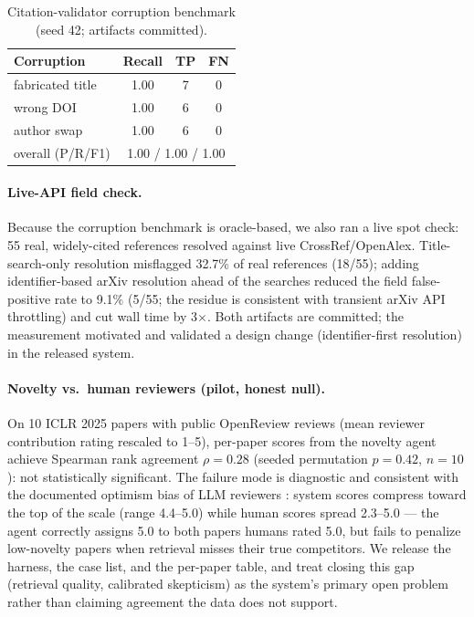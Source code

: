 \documentclass[11pt]{article}
\begin{document}
\begin{table}[t]
\centering\small
\begin{tabular}{@{}lccc@{}}
\toprule
\textbf{Corruption} & \textbf{Recall} & \textbf{TP} & \textbf{FN} \\
\midrule
fabricated title & 1.00 & 7 & 0 \\
wrong DOI & 1.00 & 6 & 0 \\
author swap & 1.00 & 6 & 0 \\
\midrule
overall (P/R/F1) & \multicolumn{3}{c}{1.00 / 1.00 / 1.00} \\
\bottomrule
\end{tabular}
\caption{Citation-validator corruption benchmark (seed 42; artifacts committed).}
\label{tab:eval}
\end{table}

\paragraph{Live-API field check.} Because the corruption benchmark is oracle-based, we also ran a live spot check: 55 real, widely-cited references resolved against live CrossRef/OpenAlex. Title-search-only resolution misflagged 32.7\% of real references (18/55); adding identifier-based arXiv resolution ahead of the searches reduced the field false-positive rate to 9.1\% (5/55; the residue is consistent with transient arXiv API throttling) and cut wall time by 3$\times$. Both artifacts are committed; the measurement motivated and validated a design change (identifier-first resolution) in the released system.

\paragraph{Novelty vs.\ human reviewers (pilot, honest null).} On 10 ICLR 2025 papers with public OpenReview reviews (mean reviewer contribution rating rescaled to 1--5), per-paper scores from the novelty agent achieve Spearman rank agreement $\rho = 0.28$ (seeded permutation $p = 0.42$, $n = 10$): not statistically significant. The failure mode is diagnostic and consistent with the documented optimism bias of LLM reviewers \citep{du2025llmreviewbias}: system scores compress toward the top of the scale (range 4.4--5.0) while human scores spread 2.3--5.0 --- the agent correctly assigns 5.0 to both papers humans rated 5.0, but fails to penalize low-novelty papers when retrieval misses their true competitors. We release the harness, the case list, and the per-paper table, and treat closing this gap (retrieval quality, calibrated skepticism) as the system's primary open problem rather than claiming agreement the data does not support.
\end{document}
